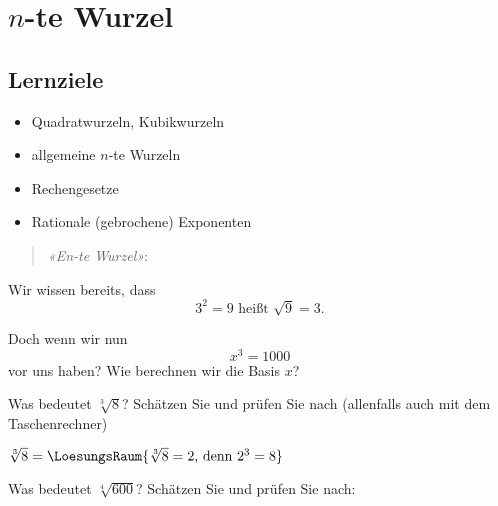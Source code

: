 
\section{$n$-te Wurzel}

\subsection*{Lernziele}

\begin{itemize}
\item Quadratwurzeln, Kubikwurzeln
\item allgemeine $n$-te Wurzeln
\item Rechengesetze
\item Rationale (gebrochene) Exponenten
\end{itemize}




\newpage


\begin{verse}
\textit{«En-te Wurzel»}:
\end{verse}

Wir wissen bereits, dass
$$3^2 = 9 \text{ heißt } \sqrt{9} = 3.$$



Doch wenn wir nun
$$x^3 = 1000$$
vor uns haben? Wie berechnen wir die Basis $x$?



Was bedeutet $\sqrt[3]{8}$? Schätzen Sie und prüfen Sie nach
(allenfalls auch mit dem Taschenrechner)

$\sqrt[3]{8} =  \LoesungsRaum{\sqrt[3]{8}=2 \text{, denn } 2^3=8}$

Was bedeutet $\sqrt[4]{600}$? Schätzen Sie und prüfen Sie nach: 



